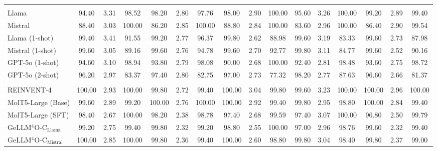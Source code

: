 \documentclass[11pt]{article}
\begin{document}
\begin{table}[t]
{\begin{tabular}{@{}l ccc@{\hspace{4pt}} ccc@{\hspace{4pt}} ccc@{\hspace{4pt}} ccc@{\hspace{4pt}} ccc@{}}
\rowcolor{gray!15} 
\multicolumn{16}{c}{\textit{General Purpose LLMs (Zero- \& Few-Shot)}} \\
Llama 
& 94.40 & 3.31 & 98.52
& 98.20 & 2.80 & 97.76
& 98.00 & 2.90 & 100.00
& 95.60 & 3.26 & 100.00
& 99.20 & 2.89 & 99.40
\\
Mistral
& 88.40 & 3.03 & 100.00
& 86.20 & 2.85 & 100.00
& 88.80 & 2.84 & 100.00
& 83.60 & 2.96 & 100.00
& 86.40 & 2.90 & 99.54
\\
Llama (1-shot) 
& 99.40 & 3.41 & 91.55
& 99.20 & 2.77 & 96.37
& 99.80 & 2.62 & 88.98
& 99.60 & 3.19 & 83.33
& 99.60 & 2.73 & 87.98
\\
Mistral (1-shot) 
& 99.60 & 3.05 & 89.16
& 99.60 & 2.76 & 94.78
& 99.60 & 2.70 & 92.77
& 99.80 & 3.11 & 84.77
& 99.60 & 2.52 & 90.16
\\
GPT-5o (1-shot) 
& 94.60 & 3.10 & 98.94
& 93.80 & 2.79 & 98.08
& 90.00 & 2.68 & 100.00
& 92.40 & 2.81 & 98.48
& 93.60 & 2.75 & 98.72
\\
GPT-5o (2-shot)
& 96.20 & 2.97 & 83.37
& 97.40 & 2.80 & 82.75
& 97.00 & 2.73 & 77.32
& 98.20 & 2.77 & 87.63
& 96.60 & 2.66 & 81.37
\\

\rowcolor{gray!15} 
\multicolumn{16}{c}{\textit{Expert Models \& SFT Baselines}} \\
REINVENT-4
& 100.00 & 2.93 & 100.00
& 99.80 & 2.72 & 99.40
& 100.00 & 3.04 & 99.80
& 99.60 & 3.23 & 100.00
& 100.00 & 2.96 & 100.00
\\
MolT5-Large (Base) 
& 99.60 & 2.89 & 99.20
& 100.00 & 2.76 & 100.00
& 100.00 & 2.92 & 99.40
& 99.80 & 2.95 & 98.80
& 100.00 & 2.84 & 99.40
\\
MolT5-Large (SFT)
& 98.40 & 2.67 & 100.00
& 98.20 & 2.38 & 98.78
& 97.40 & 2.68 & 99.59
& 97.40 & 3.07 & 100.00
& 96.80 & 2.50 & 99.79 \\
GeLLM$^4$O-C$_{\mathrm{Llama}}$
& 99.20 & 2.75 & 99.40
& 99.80 & 2.32 & 99.20
& 98.80 & 2.55 & 100.00
& 97.00 & 2.96 & 98.76
& 99.60 & 2.32 & 99.40 \\
GeLLM$^4$O-C$_{\mathrm{Mistral}}$
& 100.00 & 2.85 & 100.00
& 99.80 & 2.36 & 99.40
& 100.00 & 2.60 & 98.80
& 99.80 & 3.04 & 98.40
& 99.80 & 2.37 & 99.00 \\


\end{tabular}}
\end{table}
\end{document}
